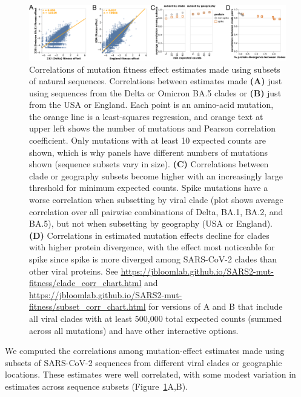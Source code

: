 \documentclass[9pt,twocolumn,twoside]{gsajnl_modified}
\begin{document}
\begin{figure}
\centering
\includegraphics[width=\linewidth]{figs/corr.png}
\caption{
Correlations of mutation fitness effect estimates made using subsets of natural sequences.
Correlations between estimates made {\bf (A)} just using sequences from the Delta or Omicron BA.5 clades or {\bf (B)} just from the USA or England.
Each point is an amino-acid mutation, the orange line is a least-squares regression, and orange text at upper left shows the number of mutations and Pearson correlation coefficient.
Only mutations with at least 10 expected counts are shown, which is why panels have different numbers of mutations shown (sequence subsets vary in size).
{\bf (C)} Correlations between clade or geography subsets become higher with an increasingly large threshold for minimum expected counts.
Spike mutations have a worse correlation when subsetting by viral clade (plot shows average correlation over all pairwise combinations of Delta, BA.1, BA.2, and BA.5), but not when subsetting by geography (USA or England).
{\bf (D)} Correlations in estimated mutation effects decline for clades with higher protein divergence, with the effect most noticeable for spike since spike is more diverged among SARS-CoV-2 clades than other viral proteins.
See \url{https://jbloomlab.github.io/SARS2-mut-fitness/clade_corr_chart.html} and \url{https://jbloomlab.github.io/SARS2-mut-fitness/subset_corr_chart.html} for versions of A and B that include all viral clades with at least 500,000 total expected counts (summed across all mutations) and have other interactive options.
\label{fig:corr}
}
\end{figure}

We computed the correlations among mutation-effect estimates made using subsets of SARS-CoV-2 sequences from different viral clades or geographic locations.
These estimates were well correlated, with some modest variation in estimates across sequence subsets (Figure~\ref{fig:corr}A,B).
\end{document}
